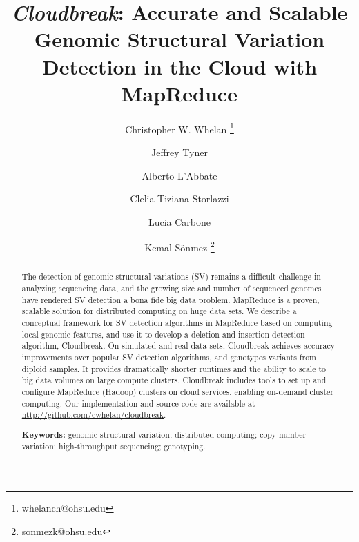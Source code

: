\documentclass[11pt]{article}
\begin{document}
\title{{\em Cloudbreak}: Accurate and Scalable Genomic Structural Variation Detection in the Cloud with MapReduce}

\author[1,5]{Christopher W. Whelan \thanks{whelanch@ohsu.edu}}
\author[3,4]{Jeffrey Tyner}
\author[6]{Alberto L'Abbate}
\author[6]{Clelia Tiziana Storlazzi}
\author[4,5]{Lucia Carbone}
\author[1,2,5]{Kemal S\"onmez \thanks{sonmezk@ohsu.edu}}

\maketitle


 \begin{abstract}

The detection of genomic structural variations (SV) remains a difficult challenge in analyzing sequencing data, and the growing size and number of sequenced genomes have rendered SV detection a bona fide big data problem. MapReduce is a proven, scalable solution for distributed computing on huge data sets. We describe a conceptual framework for SV detection algorithms in MapReduce based on computing local genomic features, and use it to develop a deletion and insertion detection algorithm, Cloudbreak. On simulated and real data sets, Cloudbreak achieves accuracy improvements over popular SV detection algorithms, and genotypes variants from diploid samples. It provides dramatically shorter runtimes and the ability to scale to big data volumes on large compute clusters. Cloudbreak includes tools to set up and configure MapReduce (Hadoop) clusters on cloud services, enabling on-demand cluster computing. Our implementation and source code are available at \url{http://github.com/cwhelan/cloudbreak}. 

 \medskip
 \noindent\textbf{Keywords:} genomic structural variation; distributed computing; copy number variation; high-throughput sequencing; genotyping.
 \end{abstract}


\newpage
\end{document}
